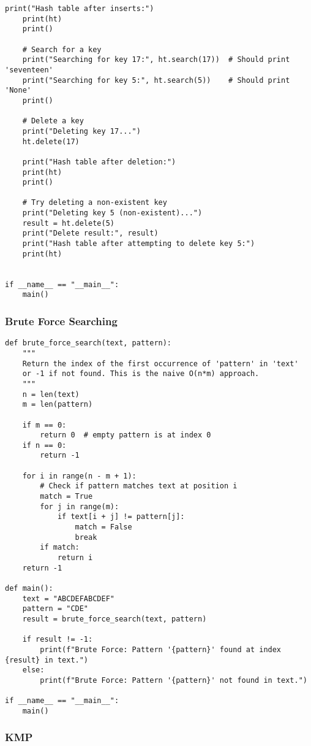 \documentclass[a4paper,12pt]{article}
\begin{document}
\begin{lstlisting}[style=pythonstyle]
    print("Hash table after inserts:")
    print(ht)
    print()

    # Search for a key
    print("Searching for key 17:", ht.search(17))  # Should print 'seventeen'
    print("Searching for key 5:", ht.search(5))    # Should print 'None'
    print()

    # Delete a key
    print("Deleting key 17...")
    ht.delete(17)

    print("Hash table after deletion:")
    print(ht)
    print()

    # Try deleting a non-existent key
    print("Deleting key 5 (non-existent)...")
    result = ht.delete(5)
    print("Delete result:", result)
    print("Hash table after attempting to delete key 5:")
    print(ht)


if __name__ == "__main__":
    main()
\end{lstlisting}

\subsubsection{Brute Force Searching}

\begin{lstlisting}[style=pythonstyle]
def brute_force_search(text, pattern):
    """
    Return the index of the first occurrence of 'pattern' in 'text'
    or -1 if not found. This is the naive O(n*m) approach.
    """
    n = len(text)
    m = len(pattern)

    if m == 0:
        return 0  # empty pattern is at index 0
    if n == 0:
        return -1

    for i in range(n - m + 1):
        # Check if pattern matches text at position i
        match = True
        for j in range(m):
            if text[i + j] != pattern[j]:
                match = False
                break
        if match:
            return i
    return -1

def main():
    text = "ABCDEFABCDEF"
    pattern = "CDE"
    result = brute_force_search(text, pattern)

    if result != -1:
        print(f"Brute Force: Pattern '{pattern}' found at index {result} in text.")
    else:
        print(f"Brute Force: Pattern '{pattern}' not found in text.")

if __name__ == "__main__":
    main()
\end{lstlisting}

\subsubsection{KMP}
\end{document}
